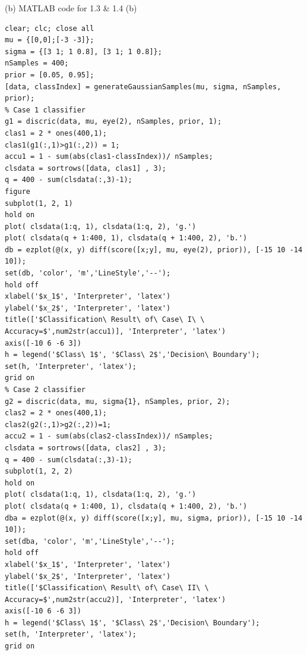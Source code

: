 \documentclass[12pt]{article}
\begin{document}
\noindent (b) MATLAB code for 1.3 \& 1.4 (b)
\begin{lstlisting}
clear; clc; close all
mu = {[0,0];[-3 -3]};
sigma = {[3 1; 1 0.8], [3 1; 1 0.8]};
nSamples = 400;
prior = [0.05, 0.95];
[data, classIndex] = generateGaussianSamples(mu, sigma, nSamples, prior);
% Case 1 classifier
g1 = discric(data, mu, eye(2), nSamples, prior, 1);
clas1 = 2 * ones(400,1);
clas1(g1(:,1)>g1(:,2)) = 1;
accu1 = 1 - sum(abs(clas1-classIndex))/ nSamples;
clsdata = sortrows([data, clas1] , 3);
q = 400 - sum(clsdata(:,3)-1);
figure 
subplot(1, 2, 1)
hold on
plot( clsdata(1:q, 1), clsdata(1:q, 2), 'g.')
plot( clsdata(q + 1:400, 1), clsdata(q + 1:400, 2), 'b.')
db = ezplot(@(x, y) diff(score([x;y], mu, eye(2), prior)), [-15 10 -14 10]);
set(db, 'color', 'm','LineStyle','--');
hold off
xlabel('$x_1$', 'Interpreter', 'latex')
ylabel('$x_2$', 'Interpreter', 'latex')
title(['$Classification\ Result\ of\ Case\ I\ \ Accuracy=$',num2str(accu1)], 'Interpreter', 'latex')
axis([-10 6 -6 3])
h = legend('$Class\ 1$', '$Class\ 2$','Decision\ Boundary');
set(h, 'Interpreter', 'latex');
grid on
% Case 2 classifier
g2 = discric(data, mu, sigma{1}, nSamples, prior, 2);
clas2 = 2 * ones(400,1);
clas2(g2(:,1)>g2(:,2))=1;
accu2 = 1 - sum(abs(clas2-classIndex))/ nSamples;
clsdata = sortrows([data, clas2] , 3);
q = 400 - sum(clsdata(:,3)-1);
subplot(1, 2, 2)
hold on
plot( clsdata(1:q, 1), clsdata(1:q, 2), 'g.')
plot( clsdata(q + 1:400, 1), clsdata(q + 1:400, 2), 'b.')
dba = ezplot(@(x, y) diff(score([x;y], mu, sigma, prior)), [-15 10 -14 10]);
set(dba, 'color', 'm','LineStyle','--');
hold off
xlabel('$x_1$', 'Interpreter', 'latex')
ylabel('$x_2$', 'Interpreter', 'latex')
title(['$Classification\ Result\ of\ Case\ II\ \ Accuracy=$',num2str(accu2)], 'Interpreter', 'latex')
axis([-10 6 -6 3])
h = legend('$Class\ 1$', '$Class\ 2$','Decision\ Boundary');
set(h, 'Interpreter', 'latex');
grid on
\end{lstlisting}
\end{document}
